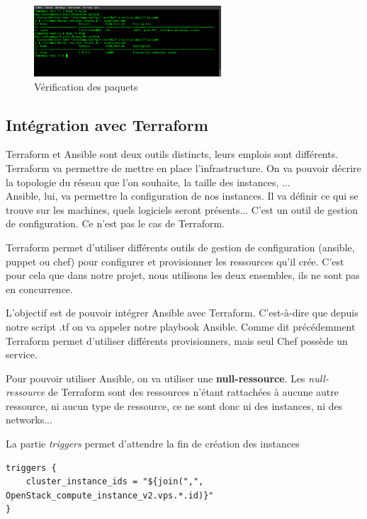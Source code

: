 \documentclass[]{article}
\begin{document}
\begin{figure}
\centering
\includegraphics[height=100px]{Images/verification.png}
\caption{Vérification des paquets}
\end{figure}




\subsection{Intégration avec Terraform}\label{intuxe9gration-avec-terraform}

Terraform et Ansible sont deux outils distincts, leurs emplois sont différents.\\
Terraform va permettre de mettre en place l'infrastructure. On va pouvoir décrire la topologie du réseau que l'on souhaite, la taille des instances, ... \\
Ansible, lui, va permettre la configuration de nos instances. Il va définir ce qui se trouve sur les machines, quels logiciels seront présents... C'est un outil de gestion de configuration. Ce n'est pas le cas de Terraform. 

Terraform permet d'utiliser différents outils de gestion de configuration (ansible, puppet ou chef) pour configurer et provisionner les ressources qu'il crée. C'est pour cela que dans notre projet, nous utilisons les deux ensembles, ils ne sont pas en concurrence. 

L'objectif est de pouvoir intégrer Ansible avec Terraform.
C'est-à-dire que depuis notre script .tf on va appeler notre playbook Ansible. 
Comme dit précédemment Terraform permet d'utiliser différents provisionners, mais seul Chef possède un service. 

Pour pouvoir utiliser Ansible, on va utiliser une \textbf{null-ressource}. Les \textit{null-ressource} de Terraform sont des ressources n'étant rattachées à aucune autre ressource, ni aucun type de ressource, ce ne sont donc ni des instances, ni des networks...

La partie \textit{triggers} permet d'attendre la fin de création des instances
\begin{verbatim}
triggers { 
    cluster_instance_ids = "${join(",", OpenStack_compute_instance_v2.vps.*.id)}"
}
\end{verbatim}
\end{document}
